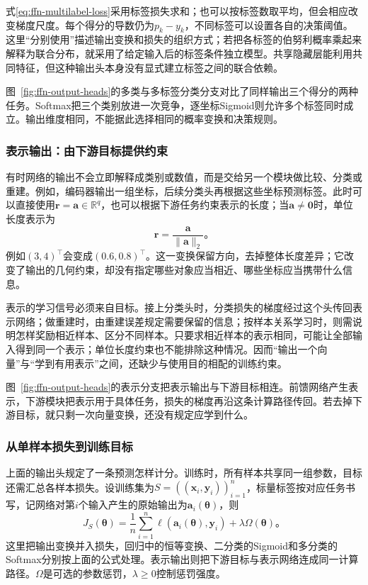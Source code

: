 式\eqref{eq:ffn-multilabel-loss}采用标签损失求和；也可以按标签数取平均，但会相应改变梯度尺度。每个得分的导数仍为$p_k-y_k$，不同标签可以设置各自的决策阈值。这里“分别使用”描述输出变换和损失的组织方式；若把各标签的伯努利概率乘起来解释为联合分布，就采用了给定输入后的标签条件独立模型。共享隐藏层能利用共同特征，但这种输出头本身没有显式建立标签之间的联合依赖。

图~\ref{fig:ffn-output-heads}的多类与多标签分类分支对比了同样输出三个得分的两种任务。Softmax把三个类别放进一次竞争，逐坐标Sigmoid则允许多个标签同时成立。输出维度相同，不能据此选择相同的概率变换和决策规则。


\subsubsection{表示输出：由下游目标提供约束}
\label{sec:ffn-output-representation}

有时网络的输出不会立即解释成类别或数值，而是交给另一个模块做比较、分类或重建。例如，编码器输出一组坐标，后续分类头再根据这些坐标预测标签。此时可以直接使用$\bm{r}=\bm{a}\in\mathbb{R}^{q}$，也可以根据下游任务约束表示的长度；当$\bm{a}\neq\bm{0}$时，单位长度表示为
\begin{equation}
  \bm{r}=\frac{\bm{a}}{\lVert\bm{a}\rVert_2}\text{。}
  \label{eq:ffn-normalized-representation}
\end{equation}
例如$(3,4)^{\top}$会变成$(0.6,0.8)^{\top}$。这一变换保留方向，去掉整体长度差异；它改变了输出的几何约束，却没有指定哪些对象应当相近、哪些坐标应当携带什么信息。

表示的学习信号必须来自目标。接上分类头时，分类损失的梯度经过这个头传回表示网络；做重建时，由重建误差规定需要保留的信息；按样本关系学习时，则需说明怎样奖励相近样本、区分不同样本。只要求相近样本的表示相同，可能让全部输入得到同一个表示；单位长度约束也不能排除这种情况。因而“输出一个向量”与“学到有用表示”之间，还缺少与使用目的相配的训练约束。

图~\ref{fig:ffn-output-heads}的表示分支把表示输出与下游目标相连。前馈网络产生表示，下游模块把表示用于具体任务，损失的梯度再沿这条计算路径传回。若去掉下游目标，就只剩一次向量变换，还没有规定应学到什么。


\subsubsection{从单样本损失到训练目标}
\label{sec:ffn-empirical-objective}

上面的输出头规定了一条预测怎样计分。训练时，所有样本共享同一组参数，目标还需汇总各样本损失。设训练集为$S=((\bm{x}_i,\bm{y}_i))_{i=1}^{n}$，标量标签按对应任务书写，记网络对第$i$个输入产生的原始输出为$\bm{a}_i(\bm{\theta})$，则
\begin{equation}
  J_S(\bm{\theta})=
  \frac1n\sum_{i=1}^{n}\ell\!\left(\bm{a}_i(\bm{\theta}),\bm{y}_i\right)
  +\lambda\Omega(\bm{\theta})\text{。}
  \label{eq:ffn-training-objective}
\end{equation}
这里把输出变换并入损失，回归中的恒等变换、二分类的Sigmoid和多分类的Softmax分别按上面的公式处理。表示输出则把下游目标与表示网络连成同一计算路径。$\Omega$是可选的参数惩罚，$\lambda\geq0$控制惩罚强度。

